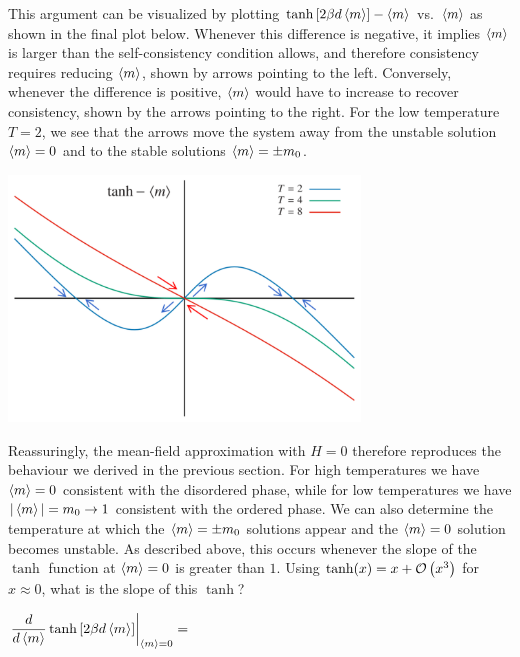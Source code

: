 This argument can be visualized by plotting $\tanh\left[2\beta d\left\langle m \right\rangle\right] - \left\langle m \right\rangle$ vs.\ $\left\langle m \right\rangle$ as shown in the final plot below.
Whenever this difference is negative, it implies $\left\langle m \right\rangle$ is larger than the self-consistency condition allows, and therefore consistency requires reducing $\left\langle m \right\rangle$, shown by arrows pointing to the left.
Conversely, whenever the difference is positive, $\left\langle m \right\rangle$ would have to increase to recover consistency, shown by the arrows pointing to the right.
For the low temperature $T = 2$, we see that the arrows move the system away from the unstable solution $\left\langle m \right\rangle = 0$ and to the stable solutions $\left\langle m \right\rangle = \pm m_0$.

\begin{center}\includegraphics[width=0.7\textwidth]{figs/week10_consistency_flow.pdf}\end{center}

Reassuringly, the mean-field approximation with $H = 0$ therefore reproduces the behaviour we derived in the previous section.
For high temperatures we have $\left\langle m \right\rangle = 0$ consistent with the disordered phase, while for low temperatures we have $|\left\langle m \right\rangle| = m_0 \to 1$ consistent with the ordered phase.
We can also determine the temperature at which the $\left\langle m \right\rangle = \pm m_0$ solutions appear and the $\left\langle m \right\rangle = 0$ solution becomes unstable.
As described above, this occurs whenever the slope of the $\tanh$ function at $\left\langle m \right\rangle = 0$ is greater than $1$.
Using $\tanh(x) = x + \mathcal O\left(x^3\right)$ for $x \approx 0$, what is the slope of this $\tanh$?
\begin{mdframed}
  $\displaystyle \left. \frac{d}{d\left\langle m \right\rangle} \tanh\left[2\beta d\left\langle m \right\rangle\right]\right|_{\left\langle m \right\rangle = 0} = $ \\[50 pt]
\end{mdframed}

